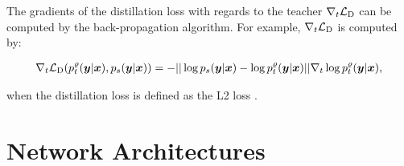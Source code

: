 \documentclass{article}
\newcommand{\OVEC}[1]{\bm{#1}} %
\newcommand{\DTN}{\mathcal{L}_{\rm{D}}}
\newcommand{\abbrpstd}{p_{s}}
\newcommand{\fullpstd}[1]{p_{s}(#1|\OVEC{x})}
\newcommand{\abbrptch}{p_{t}^{\varrho}}
\newcommand{\fullptch}[1]{p_{t}^{\varrho}(#1|\OVEC{x})}
\begin{document}
The gradients of the distillation loss with regards to the teacher $\nabla_{t}\DTN$ can be computed by the back-propagation algorithm.
For example, $\nabla_{t}\DTN$ is computed by:
\begin{small}
\begin{equation*}
\begin{aligned}
\nabla_{t}
\DTN(\fullptch{\OVEC{y}},\fullpstd{\OVEC{y}})
=
-
||\log\fullpstd{\OVEC{y}}-\log\fullptch{\OVEC{y}}||
\nabla_{t}\log\fullptch{\OVEC{y}}
\text{,}
\\
\end{aligned}
\end{equation*}
\end{small}%
when the distillation loss is defined as the L2 loss \cite{ba2014deep}.


\section{Network Architectures} \label{app:architecture}
\end{document}

